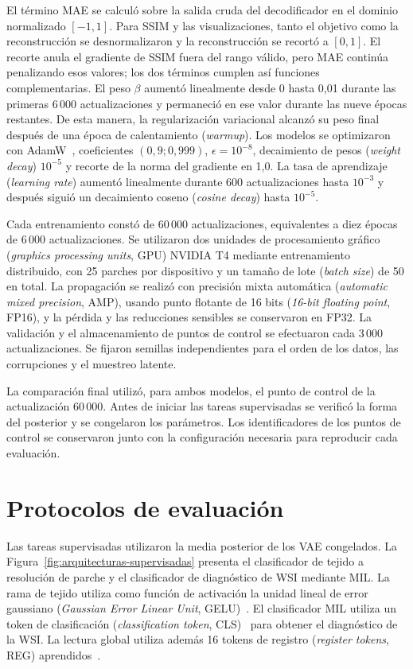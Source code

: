 El término MAE se calculó sobre la salida cruda del decodificador en el dominio
normalizado \([-1,1]\). Para SSIM y las visualizaciones, tanto el objetivo como
la reconstrucción se desnormalizaron y la reconstrucción se recortó a
\([0,1]\). El recorte anula el gradiente de SSIM fuera del rango válido, pero
MAE continúa penalizando esos valores; los dos términos cumplen así funciones
complementarias.
El peso \(\beta\) aumentó linealmente desde 0 hasta 0,01 durante las primeras
\(6\,000\) actualizaciones y permaneció en ese valor durante las nueve épocas
restantes. De esta manera, la regularización variacional alcanzó su peso final
después de una época de calentamiento (\emph{warmup}).
Los modelos se optimizaron con AdamW~\cite{loshchilov_adamw_2019}, coeficientes
\((0,9;0,999)\),
\(\epsilon=10^{-8}\), decaimiento de pesos (\emph{weight decay}) \(10^{-5}\) y recorte de la norma
del gradiente en 1,0. La tasa de aprendizaje (\emph{learning rate}) aumentó linealmente durante 600
actualizaciones hasta \(10^{-3}\) y después siguió un decaimiento coseno (\emph{cosine decay})
hasta \(10^{-5}\).

Cada entrenamiento constó de \(60\,000\) actualizaciones, equivalentes a diez
épocas de \(6\,000\) actualizaciones. Se utilizaron dos unidades de procesamiento gráfico (\emph{graphics processing units}, GPU) NVIDIA T4 mediante
entrenamiento distribuido, con 25 parches por dispositivo y un tamaño de lote
(\emph{batch size}) de 50 en total. La propagación se realizó con precisión mixta automática
(\emph{automatic mixed precision}, AMP), usando punto flotante de 16 bits (\emph{16-bit floating point}, FP16), y la pérdida
y las reducciones sensibles se conservaron en FP32. La validación y el
almacenamiento de puntos de control se efectuaron cada \(3\,000\)
actualizaciones. Se fijaron semillas independientes para el orden de los datos,
las corrupciones y el muestreo latente.

La comparación final utilizó, para ambos modelos, el punto de control de la
actualización \(60\,000\). Antes de iniciar las tareas supervisadas se verificó
la forma del posterior y se congelaron los parámetros. Los identificadores
de los puntos de control se conservaron junto con la configuración necesaria
para reproducir cada evaluación.

\section{Protocolos de evaluación}

Las tareas supervisadas utilizaron la media posterior de los VAE congelados.
La Figura~\ref{fig:arquitecturas-supervisadas} presenta el clasificador de
tejido a resolución de parche y el clasificador de diagnóstico de WSI
mediante MIL.
La rama de tejido utiliza como función de activación la unidad lineal de error
gaussiano (\emph{Gaussian Error Linear Unit}, GELU)~\cite{hendrycks_gelu_2016}.
El clasificador MIL utiliza un token de clasificación
(\emph{classification token}, CLS)~\cite{devlin_bert_2019} para obtener el
diagnóstico de la WSI.
La lectura global utiliza además 16 tokens de registro
(\emph{register tokens}, REG) aprendidos~\cite{darcet_registers_2023}.

